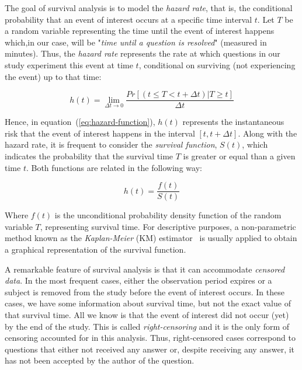 \documentclass{chi2012}
\begin{document}
The goal of survival analysis is to model the \textit{hazard rate}, that is, the 
conditional probability that an event of interest occurs at a specific time interval 
$t$. Let $T$ be a random variable representing the time until the event of interest 
happens which,in our case, will be "\textit{time until a question is resolved}" 
(measured in minutes). 
Thus, the \textit{hazard rate} represents the rate at which questions in our study
experiment this event at time $t$, conditional on surviving (not experiencing the event) 
up to that time:

\begin{equation}
\label{eq:hazard-function}
  h(t) = \lim_{\Delta t \to 0} \frac{Pr\left[\left(t \leq T < t + \Delta t\right)|T\geq t\right]}{\Delta t}
\end{equation}

Hence, in equation~(\ref{eq:hazard-function}), $h(t)$ represents the instantaneous risk 
that the event of interest happens in the interval $[t, t+\Delta t]$. Along with the
hazard rate, it is frequent to consider the \textit{survival function}, $S(t)$, which 
indicates the probability that the survival time $T$ is greater or equal than a given 
time $t$. Both functions are related in the following way:

\begin{equation}
  h(t)=\frac{f(t)}{S(t)}
\end{equation}

Where $f(t)$ is the unconditional probability density function of the random variable $T$,
representing survival time. For descriptive purposes, a non-parametric method known as the
\textit{Kaplan-Meier} (KM) estimator~\cite{kaplan-meier1958} is usually applied to obtain 
a graphical representation of the survival function.

A remarkable feature of survival analysis is that it can accommodate \textit{censored data}. 
In the most frequent cases, either the observation period expires or a subject is removed 
from the study before the event of interest occurs. In these cases, we have some information
about survival time, but not the exact value of that survival time. All we know is that 
the event of interest did not occur (yet) by the end of the study. This is called 
\textit{right-censoring} and it is the only form of censoring accounted for in this analysis.
Thus, right-censored cases correspond to questions that either not received any
answer or, despite receiving any answer, it has not been accepted by the author of the question.
\end{document}
